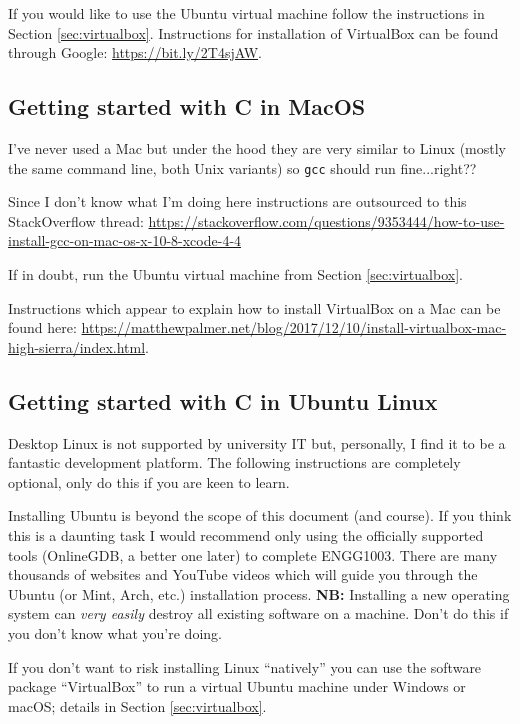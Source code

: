 \documentclass{lab}
\begin{document}
If you would like to use the Ubuntu virtual machine follow the instructions in Section \ref{sec:virtualbox}. Instructions for installation of VirtualBox can be found through Google: \url{https://bit.ly/2T4sjAW}.

\subsection{Getting started with C in MacOS}

I've never used a Mac but under the hood they are very similar to Linux (mostly the same command line, both Unix variants) so \texttt{gcc} should run fine...right??

Since I don't know what I'm doing here instructions are outsourced to this StackOverflow thread: \url{https://stackoverflow.com/questions/9353444/how-to-use-install-gcc-on-mac-os-x-10-8-xcode-4-4}

If in doubt, run the Ubuntu virtual machine from Section \ref{sec:virtualbox}.

Instructions which appear to explain how to install VirtualBox on a Mac can be found here: \url{https://matthewpalmer.net/blog/2017/12/10/install-virtualbox-mac-high-sierra/index.html}.

\pagebreak
\subsection{Getting started with C in Ubuntu Linux}

Desktop Linux is not supported by university IT but, personally, I find it to be a fantastic development platform. The following instructions are completely optional, only do this if you are keen to learn.

Installing Ubuntu is beyond the scope of this document (and course). If you think this is a daunting task I would recommend only using the officially supported tools (OnlineGDB, a better one later) to complete ENGG1003. There are many thousands of websites and YouTube videos which will guide you through the Ubuntu (or Mint, Arch, etc.) installation process. \textbf{NB:} Installing a new operating system can \textit{very easily} destroy all existing software on a machine. Don't do this if you don't know what you're doing.

If you don't want to risk installing Linux ``natively'' you can use the software package ``VirtualBox'' to run a virtual Ubuntu machine under Windows or macOS; details in Section \ref{sec:virtualbox}.
\end{document}
